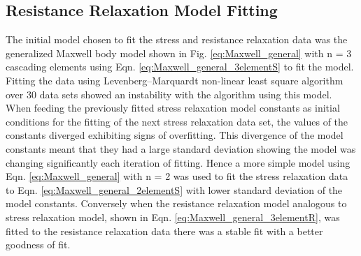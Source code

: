 \subsection*{Resistance Relaxation Model Fitting}
The initial model chosen to fit the stress and resistance relaxation data was the generalized Maxwell body model shown in Fig. \ref{eq:Maxwell_general} with n = 3 cascading elements using Eqn. \ref{eq:Maxwell_general_3elementS} to fit the model. Fitting the data using Levenberg–Marquardt non-linear least square algorithm over 30 data sets showed an instability with the algorithm using this model. When feeding the previously fitted stress relaxation model constants as initial conditions for the fitting of the next stress relaxation data set, the values of the constants diverged exhibiting signs of overfitting. This divergence of the model constants meant that they had a large standard deviation showing the model was changing significantly each iteration of fitting. Hence a more simple model using Eqn. \ref{eq:Maxwell_general} with n = 2 was used to fit the stress relaxation data to Eqn. \ref{eq:Maxwell_general_2elementS} with lower standard deviation of the model constants. Conversely when the resistance relaxation model analogous to stress relaxation model, shown in Eqn. \ref{eq:Maxwell_general_3elementR}, was fitted to the resistance relaxation data there was a stable fit with a better goodness of fit.

